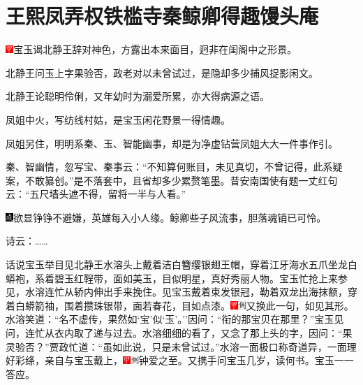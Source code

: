 

\chapter{王熙凤弄权铁槛寺\hspace{.5em}秦鲸卿得趣馒头庵}
{\includegraphics[width=3mm]{../Images/00002}\kaishu 宝玉谒北静王辞对神色，方露出本来面目，迥非在闺阁中之形景。}

{\kaishu 北静王问玉上字果验否，政老对以未曾试过，是隐却多少捕风捉影闲文。}

{\kaishu 北静王论聪明伶俐，又年幼时为溺爱所累，亦大得病源之语。}

{\kaishu 凤姐中火，写纺线村姑，是宝玉闲花野景一得情趣。}

{\kaishu 凤姐另住，明明系秦、玉、智能幽事，却是为净虚钻营凤姐大大一件事作引。}

{\kaishu 秦、智幽情，忽写宝、秦事云：``不知算何账目，未见真切，不曾记得，此系疑案，不敢纂创。''是不落套中，且省却多少累赘笔墨。昔安南国使有题一丈红句云：``五尺墙头遮不得，留将一半与人看。''}

{\includegraphics[width=3mm]{../Images/00005}\kaishu 欲显铮铮不避嫌，英雄每入小人缘。鲸卿些子风流事，胆落魂销已可怜。}

诗云：\ldots{}\ldots{}

话说宝玉举目见北静王水溶头上戴着洁白簪缨银翅王帽，穿着江牙海水五爪坐龙白蟒袍，系着碧玉红鞓带，面如美玉，目似明星，真好秀丽人物。宝玉忙抢上来参见，水溶连忙从轿内伸出手来挽住。见宝玉戴着束发银冠，勒着双龙出海抹额，穿着白蟒箭袖，围着攒珠银带，面若春花，目如点漆。{\includegraphics[width=3mm]{../Images/00002}\includegraphics[width=3mm]{../Images/00011}\footnotesize \kaishu 又换此一句，如见其形。}水溶笑道：``名不虚传，果然如`宝'似`玉'。''因问：``衔的那宝贝在那里？''宝玉见问，连忙从衣内取了递与过去。水溶细细的看了，又念了那上头的字，因问：``果灵验否？''贾政忙道：``虽如此说，只是未曾试过。''水溶一面极口称奇道异，一面理好彩绦，亲自与宝玉戴上，{\includegraphics[width=3mm]{../Images/00002}\includegraphics[width=3mm]{../Images/00011}\footnotesize \kaishu 钟爱之至。}又携手问宝玉几岁，读何书。宝玉一一答应。

